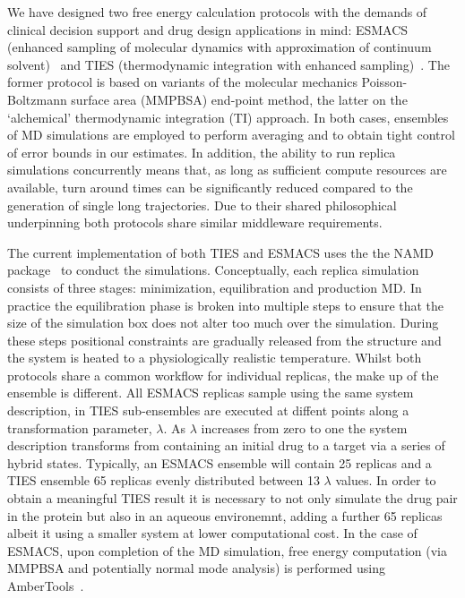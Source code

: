 We have designed two free energy calculation protocols with the demands of clinical
decision support and drug design applications in mind: ESMACS (enhanced
sampling of molecular dynamics with approximation of continuum
solvent)~\cite{Wan2017brd4} and TIES (thermodynamic integration with enhanced
sampling)~\cite{Bhati2017}. 
The former protocol is based on variants of the molecular mechanics Poisson-Boltzmann 
surface area (MMPBSA) end-point method, the latter on the `alchemical' thermodynamic 
integration (TI) approach. 
In both cases, ensembles of MD simulations are employed to perform averaging and
to obtain tight control of error bounds in our estimates. 
In addition, the ability to run replica simulations concurrently means that, as long as
sufficient compute resources are available, turn around times can be significantly 
reduced compared to the generation of single long trajectories.
Due to their shared philosophical underpinning both protocols share similar middleware 
requirements.

The current implementation of both TIES and ESMACS uses the the NAMD package~\cite{Phillips2005}
to conduct the simulations.
Conceptually, each replica simulation consists of three stages: minimization, equilibration 
and production MD.
In practice the equilibration phase is broken into multiple steps to ensure that the size of the 
simulation box does not alter too much over the simulation.
During these steps positional constraints are gradually released from the structure and the 
system is heated to a physiologically realistic temperature.
Whilst both protocols share a common workflow for individual replicas, the make up of the 
ensemble is different.
All ESMACS replicas sample using the same system description, in TIES sub-ensembles are executed 
at diffent points along a transformation parameter, $\lambda$.
As $\lambda$ increases from zero to one the system description transforms from containing an 
initial drug to a target via a series of hybrid states.
Typically, an ESMACS ensemble will contain 25 replicas and a TIES ensemble 65 replicas evenly 
distributed between 13 $\lambda$ values.
In order to obtain a meaningful TIES result it is necessary to not only simulate the drug pair 
in the protein but also in an aqueous environemnt, adding a further 65 replicas albeit it using a
smaller system at lower computational cost.
In the case of ESMACS, upon completion of the MD simulation, free energy computation 
(via MMPBSA and potentially normal mode analysis) is performed using 
AmberTools~\cite{amber14, Case2005, MillerIII2012}.


